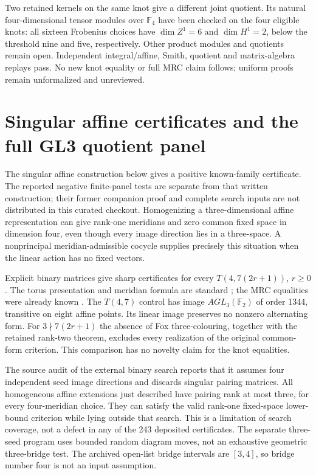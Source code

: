 \documentclass[11pt]{article}
\newcommand{\F}{\mathbb F}
\begin{document}
Two retained kernels on the same knot give a different joint
quotient. Its natural four-dimensional tensor modules over
$\F_4$ have been checked on the four eligible knots: all sixteen
Frobenius choices have $\dim Z^1=6$ and $\dim H^1=2$, below the
threshold nine and five, respectively. Other product modules and
quotients remain open. Independent integral/affine, Smith, quotient
and matrix-algebra replays pass. No new knot equality or full MRC
claim follows; uniform proofs remain unformalized and unreviewed.

\section{Singular affine certificates and the full GL3 quotient panel}

The singular affine construction below gives a positive known-family
certificate. The reported negative finite-panel tests are separate from
that written construction; their former companion proof and complete
search inputs are not distributed in this curated checkout. Homogenizing a three-dimensional affine representation
can give rank-one meridians and zero common fixed space in dimension
four, even though every image direction lies in a three-space. A
nonprincipal meridian-admissible cocycle supplies precisely this
situation when the linear action has no fixed vectors.

Explicit binary matrices give sharp certificates for every
$T(4,7(2r+1))$, $r\ge0$. The torus presentation and meridian formula
are standard \cite{cornwell}; the MRC equalities were already known
\cite{rz}. The $T(4,7)$ control has image $AGL_3(\F_2)$ of order
1344, transitive on eight affine points. Its linear image preserves
no nonzero alternating form. For $3\nmid7(2r+1)$ the absence of
Fox three-colouring, together with the retained rank-two theorem,
excludes every realization of the original common-form criterion.
This comparison has no novelty claim for the knot equalities.

The source audit of the external binary search reports that it assumes four independent seed image directions and
discards singular pairing matrices. All homogeneous affine
extensions just described have pairing rank at most three, for
every four-meridian choice. They can satisfy the valid rank-one
fixed-space lower-bound criterion while lying outside that search.
This is a limitation of search coverage, not a defect in any of
the 243 deposited certificates. The separate three-seed program
uses bounded random diagram moves, not an exhaustive geometric
three-bridge test. The archived open-list bridge intervals are
$[3,4]$, so bridge number four is not an input assumption.
\end{document}
